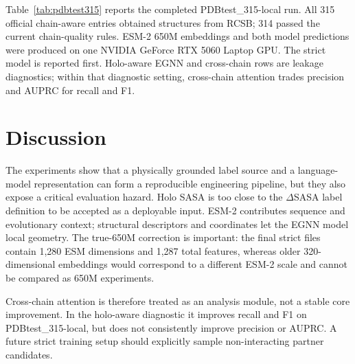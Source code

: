 \documentclass[runningheads]{llncs}
\begin{document}
Table~\ref{tab:pdbtest315} reports the completed PDBtest\_315-local run. All 315 official
chain-aware entries obtained structures from RCSB; 314 passed the current chain-quality
rules. ESM-2 650M embeddings and both model predictions were produced on one NVIDIA
GeForce RTX 5060 Laptop GPU. The strict model is reported first. Holo-aware EGNN and
cross-chain rows are leakage diagnostics; within that diagnostic setting, cross-chain
attention trades precision and AUPRC for recall and F1.

\begin{table}[t]
\centering
\caption{External prediction on PDBtest\_315-local (314 complexes, 65,119 residues).}
\label{tab:pdbtest315}
\end{table}

\section{Discussion}

The experiments show that a physically grounded label source and a language-model
representation can form a reproducible engineering pipeline, but they also expose a
critical evaluation hazard. Holo SASA is too close to the \(\Delta\)SASA label
definition to be accepted as a deployable input. ESM-2 contributes sequence and
evolutionary context; structural descriptors and coordinates let the EGNN model local
geometry. The true-650M correction is important: the final strict files contain 1,280
ESM dimensions and 1,287 total features,
whereas older 320-dimensional embeddings would correspond to a different ESM-2 scale and
cannot be compared as 650M experiments.

Cross-chain attention is therefore treated as an analysis module, not a stable core
improvement. In the holo-aware diagnostic it improves recall and F1 on
PDBtest\_315-local, but does not consistently improve precision or AUPRC. A future
strict training setup should explicitly sample non-interacting partner candidates.
\end{document}
